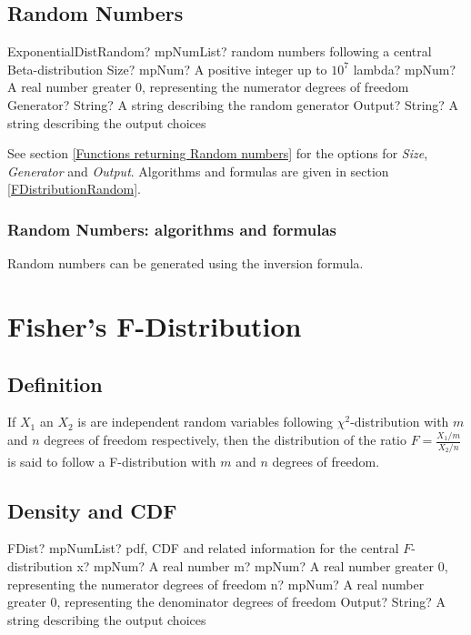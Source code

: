 \subsection{Random Numbers}

\begin{mpFunctionsExtract}
	\mpFunctionFourNotImplemented
	{ExponentialDistRandom? mpNumList? random numbers following a central Beta-distribution}
	{Size? mpNum? A positive integer up to $10^7$}
	{lambda? mpNum? A real number greater 0, representing the numerator  degrees of freedom}
	{Generator? String? A string describing the random generator}
	{Output? String? A string describing the output choices}
\end{mpFunctionsExtract}

\vspace{0.3cm}

See section \ref{Functions returning Random numbers} for the options for  {\itshape\sffamily Size},  {\itshape\sffamily Generator} and {\itshape\sffamily Output}. Algorithms and formulas are given in section \ref{FDistributionRandom}.


\subsubsection{Random Numbers: algorithms and formulas}
Random numbers can be generated using the inversion formula.



\newpage
\section{Fisher's F-Distribution}
\label{FDistribution}

\subsection{Definition}
\label{FDistributionDefinition}

If $X_1$ an $X_2$ is are independent random variables  following  $\chi^2$-distribution with $m$ and $n$ degrees of freedom respectively, 
then the distribution of the ratio $F=\frac{X_1/m}{X_2/n}$ is said to follow a F-distribution with  $m$ and $n$  degrees of freedom.


\subsection{Density and CDF}

\begin{mpFunctionsExtract}
	\mpFunctionFourNotImplemented
	{FDist? mpNumList? pdf, CDF and related information for the central $F$-distribution}
	{x? mpNum? A real number}
	{m? mpNum? A real number greater 0, representing the numerator  degrees of freedom}
	{n? mpNum? A real number greater 0, representing the denominator degrees of freedom}
	{Output? String? A string describing the output choices}
\end{mpFunctionsExtract}


